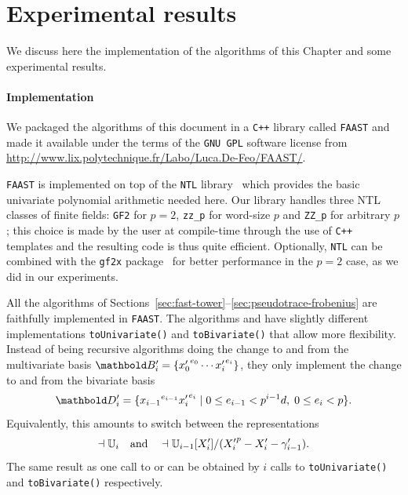 \section{Experimental results}
\label{sec:artin-benchmarks}

We discuss here the implementation of the algorithms of this Chapter
and some experimental results.

\paragraph{Implementation}
We packaged the algorithms of this document in a \texttt{C++} library
called \texttt{FAAST} and made it available under the terms of the
\texttt{GNU GPL} software license from
\url{http://www.lix.polytechnique.fr/Labo/Luca.De-Feo/FAAST/}.

\texttt{FAAST} is implemented on top of the \texttt{NTL}
library~\cite{shoup2003ntl} which provides the basic univariate
polynomial arithmetic needed here. Our library handles three NTL
classes of finite fields: \texttt{GF2} for $p=2$, \texttt{zz\_p} for
word-size $p$ and \texttt{ZZ\_p} for arbitrary $p$; this choice is made
by the user at compile-time through the use of \texttt{C++} templates
and the resulting code is thus quite efficient.  Optionally,
\texttt{NTL} can be combined with the \texttt{gf2x}
package~\cite{gf2x} for better performance in the $p=2$ case, as we
did in our experiments.

All the algorithms of
Sections~\ref{sec:fast-tower}--\ref{sec:pseudotrace-frobenius} are
faithfully implemented in \texttt{FAAST}. The algorithms
\hyperref[alg:applyisomorphism]{} and \hyperref[alg:applyinverse]{} have slightly different
implementations \texttt{toUnivariate()} and \texttt{toBivariate()}
that allow more flexibility. Instead of being recursive algorithms
doing the change to and from the multivariate basis
$\basis{B}'_i=\{{x_0'}^{e_0}\cdots {x_i'}^{e_i}\}$, they only
implement the change to and from the bivariate basis
\begin{equation}
  \label{eq:278}
  \basis{D}'_i=\{{x_{i-1}}^{e_{i-1}}{x_i'}^{e_i} \;|\;0\le
  e_{i-1}<p^{i-1}d,\; 0\le e_i<p\}
  \text{.}
\end{equation}
Equivalently, this amounts to
switch between the representations
\begin{equation}
  \dashv\mathbb{U}_i \quad\text{and}\quad
  \dashv\mathbb{U}_{i-1}[X_i']/({X_i'}^p-X_i'-\gamma_{i-1}')
  \text{.}
\end{equation}
The same result as one call to \hyperref[alg:applyisomorphism]{} or
\hyperref[alg:applyinverse]{} can be obtained by $i$ calls to
\texttt{toUnivariate()} and \texttt{toBivariate()}
respectively. 

